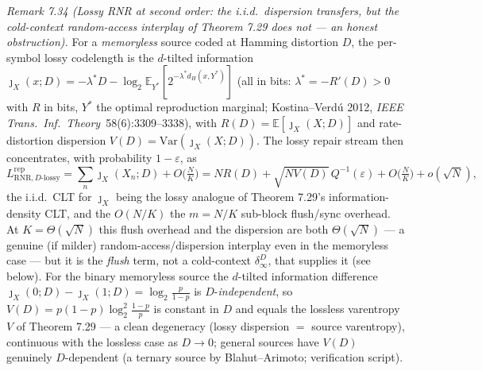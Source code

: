 \documentclass[
]{article}
\begin{document}
\emph{Remark 7.34 (Lossy RNR at second order: the i.i.d.\ dispersion transfers, but the
\emph{cold-context} random-access interplay of Theorem 7.29 does not --- an honest
obstruction).} For a
\emph{memoryless} source coded at Hamming distortion $D$, the per-symbol lossy codelength
is the $d$-tilted information $\jmath_X(x;D)=-\lambda^\ast D-\log_2\mathbb E_{Y^\ast}[2^{-
\lambda^\ast d_H(x,Y^\ast)}]$ (all in bits: $\lambda^\ast=-R'(D)>0$ with $R$ in bits,
$Y^\ast$ the optimal reproduction marginal; Kostina--Verd\'u 2012, \emph{IEEE Trans.\
Inf.\ Theory}\ 58(6):3309--3338), with $R(D)=\mathbb E[\jmath_X(X;D)]$ and rate-distortion
dispersion $V(D)=\mathrm{Var}(\jmath_X(X;D))$. The lossy repair stream then concentrates,
with probability $1-\varepsilon$, as
\[
  L^{\mathrm{rep}}_{\mathrm{RNR},D\text{-lossy}}
  =\sum_n\jmath_X(X_n;D)+O\!\bigl(\tfrac NK\bigr)
  =N R(D)+\sqrt{N V(D)}\,Q^{-1}(\varepsilon)+O\!\bigl(\tfrac NK\bigr)+o(\sqrt N),
\]
the i.i.d.\ CLT for $\jmath_X$ being the lossy analogue of Theorem 7.29's
information-density CLT, and the $O(N/K)$ the $m=N/K$ sub-block flush/sync overhead. At
$K=\Theta(\sqrt N)$ this flush overhead and the dispersion are both $\Theta(\sqrt N)$ ---
a genuine (if milder) random-access/dispersion interplay even in the memoryless case ---
but it is the \emph{flush} term, not a cold-context $\delta_\infty^D$, that supplies it
(see below). For the binary memoryless source the
$d$-tilted information difference $\jmath_X(0;D)-\jmath_X(1;D)=\log_2\tfrac{p}{1-p}$ is
$D$-\emph{independent}, so $V(D)=p(1-p)\log_2^2\tfrac{1-p}{p}$ is constant in $D$ and equals
the lossless varentropy $V$ of Theorem 7.29 --- a clean degeneracy (lossy dispersion $=$
source varentropy), continuous with the lossless case as $D\to0$; general sources have
$V(D)$ genuinely $D$-dependent (a ternary source by Blahut--Arimoto; verification script).
\end{document}
